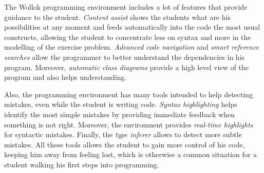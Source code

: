 % 
The Wollok programming environment includes a lot of features that provide guidance to the student.
\emph{Content assist} shows the students what are his possibilities at any moment and feeds automatically into the code the most usual constructs, 
allowing the student to concentrate less on syntax and more in the modelling of the exercise problem.
\emph{Advanced code navigation} and \emph{smart reference searches} allow the programmer to better understand the dependencies in his program.
Moreover, \emph{automatic class diagrams} provide a high level view of the program and also helps understanding.

Also, the programming environment has many tools intended to help detecting mistakes, even while the student is writing code.
\emph{Syntax highlighting} helps identify the most simple mistakes by providing immediate feedback when something is not right. 
Moreover, the enviromnent provides \emph{real-time highlights} for syntactic mistakes.
Finally, the \emph{type inferer} allows to detect more subtle mistakes.
All these tools allows the student to gain more control of his code, keeping him away from feeling lost, 
which is otherwise a common situation for a student walking his first steps into programming.

